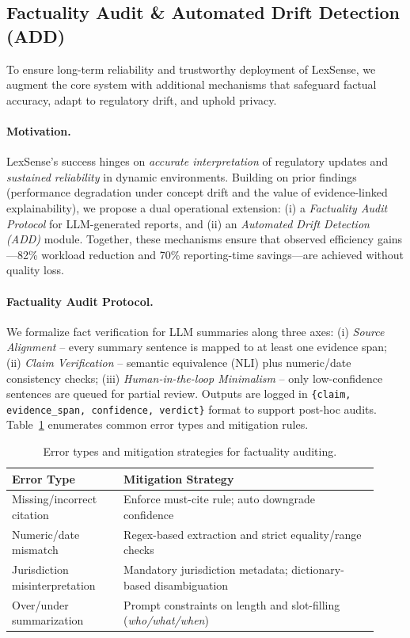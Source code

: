{\subsection{Factuality Audit \& Automated Drift Detection (ADD)}
\label{sec:factuality-add}
To ensure long-term reliability and trustworthy deployment of LexSense, we augment the core system with additional mechanisms that safeguard factual accuracy, adapt to regulatory drift, and uphold privacy.

\paragraph{Motivation.}
LexSense’s success hinges on \emph{accurate interpretation} of regulatory updates and \emph{sustained reliability} in dynamic environments. 
Building on prior findings (performance degradation under concept drift and the value of evidence-linked explainability), 
we propose a dual operational extension: 
(i) a \textit{Factuality Audit Protocol} for LLM-generated reports, and (ii) an \textit{Automated Drift Detection (ADD)} module. 
Together, these mechanisms ensure that observed efficiency gains---82\% workload reduction and 70\% reporting-time savings---are achieved without quality loss.

\paragraph{Factuality Audit Protocol.}
We formalize fact verification for LLM summaries along three axes: 
(i) \textit{Source Alignment} – every summary sentence is mapped to at least one evidence span; (ii) \textit{Claim Verification} – semantic equivalence (NLI) plus numeric/date consistency checks; (iii) \textit{Human-in-the-loop Minimalism} – only low-confidence sentences are queued for partial review.
Outputs are logged in \texttt{\{claim, evidence\_span, confidence, verdict\}} format to support post-hoc audits.  
Table~\ref{tab:error-matrix} enumerates common error types and mitigation rules.

\begin{table}[t]
\centering
\small
\caption{Error types and mitigation strategies for factuality auditing.}
\label{tab:error-matrix}
\begin{tabular}{p{0.28\linewidth}p{0.64\linewidth}}
\toprule
Error Type & Mitigation Strategy \\
\midrule
Missing/incorrect citation & Enforce must-cite rule; auto downgrade confidence \\
Numeric/date mismatch & Regex-based extraction and strict equality/range checks \\
Jurisdiction misinterpretation & Mandatory jurisdiction metadata; dictionary-based disambiguation \\
Over/under summarization & Prompt constraints on length and slot-filling (\emph{who/what/when}) \\
\bottomrule
\end{tabular}
\end{table}

}

